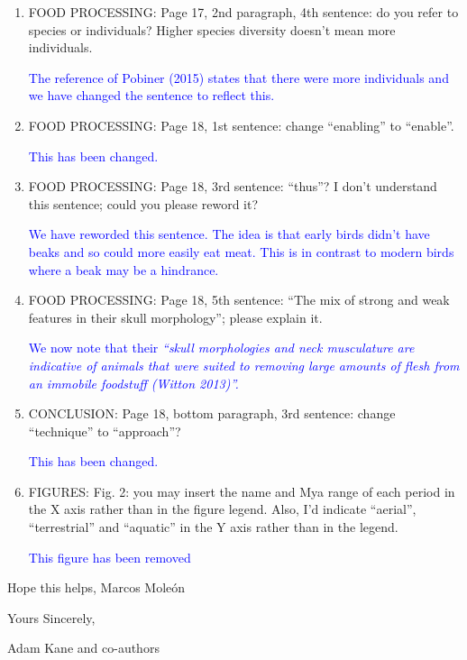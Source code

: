 \documentclass[12pt,letterpaper]{article}
\begin{document}
\begin{enumerate}
\item{FOOD PROCESSING:} Page 17, 2nd paragraph, 4th sentence: do you refer to species or individuals? Higher species diversity doesn't mean more individuals.

\textcolor{blue}{The reference of Pobiner (2015) states that there were more individuals and we have changed the sentence to reflect this.}

\item{FOOD PROCESSING:} Page 18, 1st sentence: change ``enabling'' to ``enable''.

\textcolor{blue}{This has been changed.}

\item{FOOD PROCESSING:} Page 18, 3rd sentence: ``thus''? I don't understand this sentence; could you please reword it?

\textcolor{blue}{We have reworded this sentence. The idea is that early birds didn't have beaks and so could more easily eat meat. This is in contrast to modern birds where a beak may be a hindrance.}

\item{FOOD PROCESSING:} Page 18, 5th sentence: ``The mix of strong and weak features in their skull morphology''; please explain it.

\textcolor{blue}{We now note that their \textit{``skull morphologies and neck musculature are indicative of animals that were suited to removing large amounts of flesh from an immobile foodstuff (Witton 2013)''.}}

\item{CONCLUSION:} Page 18, bottom paragraph, 3rd sentence: change ``technique'' to ``approach''?

\textcolor{blue}{This has been changed.}

\item{FIGURES:} Fig. 2: you may insert the name and Mya range of each period in the X axis rather than in the figure legend. Also, I'd indicate ``aerial'', ``terrestrial'' and ``aquatic'' in the Y axis rather than in the legend.

\textcolor{blue}{This figure has been removed}

\end{enumerate}

Hope this helps,
Marcos Mole\'{o}n

\bigskip
\bigskip
\bigskip
\bigskip
\bigskip
\bigskip
\bigskip
\bigskip

Yours Sincerely,
\bigskip

Adam Kane and co-authors 

\end{document}
